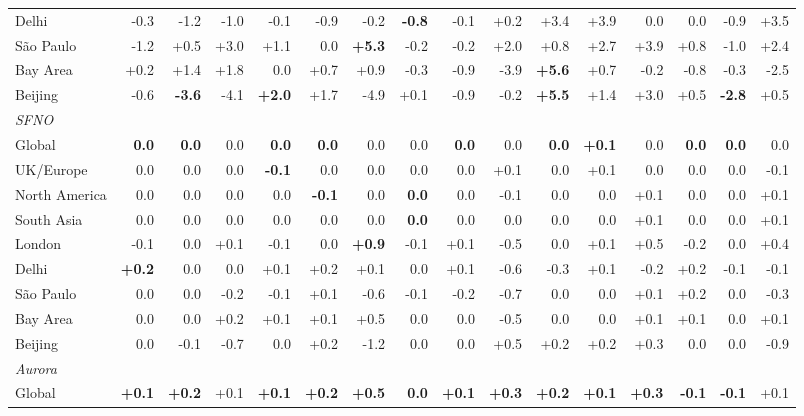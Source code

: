 \begin{table}[tbp]
\begin{tabular}{lrrrrrrrrrrrrrrr}
Delhi & -0.3 & -1.2 & -1.0 & -0.1 & -0.9 & -0.2 & \textbf{-0.8} & -0.1 & +0.2 & +3.4 & +3.9 & 0.0 & 0.0 & -0.9 & +3.5 \\
São Paulo & -1.2 & +0.5 & +3.0 & +1.1 & 0.0 & \textbf{+5.3} & -0.2 & -0.2 & +2.0 & +0.8 & +2.7 & +3.9 & +0.8 & -1.0 & +2.4 \\
Bay Area & +0.2 & +1.4 & +1.8 & 0.0 & +0.7 & +0.9 & -0.3 & -0.9 & -3.9 & \textbf{+5.6} & +0.7 & -0.2 & -0.8 & -0.3 & -2.5 \\
Beijing & -0.6 & \textbf{-3.6} & -4.1 & \textbf{+2.0} & +1.7 & -4.9 & +0.1 & -0.9 & -0.2 & \textbf{+5.5} & +1.4 & +3.0 & +0.5 & \textbf{-2.8} & +0.5 \\
\midrule
\multicolumn{16}{l}{\textit{SFNO}} \\
Global & \textbf{0.0} & \textbf{0.0} & 0.0 & \textbf{0.0} & \textbf{0.0} & 0.0 & 0.0 & \textbf{0.0} & 0.0 & \textbf{0.0} & \textbf{+0.1} & 0.0 & \textbf{0.0} & \textbf{0.0} & 0.0 \\
UK/Europe & 0.0 & 0.0 & 0.0 & \textbf{-0.1} & 0.0 & 0.0 & 0.0 & 0.0 & +0.1 & 0.0 & +0.1 & 0.0 & 0.0 & 0.0 & -0.1 \\
North America & 0.0 & 0.0 & 0.0 & 0.0 & \textbf{-0.1} & 0.0 & \textbf{0.0} & 0.0 & -0.1 & 0.0 & 0.0 & +0.1 & 0.0 & 0.0 & +0.1 \\
South Asia & 0.0 & 0.0 & 0.0 & 0.0 & 0.0 & 0.0 & \textbf{0.0} & 0.0 & 0.0 & 0.0 & 0.0 & +0.1 & 0.0 & 0.0 & +0.1 \\
London & -0.1 & 0.0 & +0.1 & -0.1 & 0.0 & \textbf{+0.9} & -0.1 & +0.1 & -0.5 & 0.0 & +0.1 & +0.5 & -0.2 & 0.0 & +0.4 \\
Delhi & \textbf{+0.2} & 0.0 & 0.0 & +0.1 & +0.2 & +0.1 & 0.0 & +0.1 & -0.6 & -0.3 & +0.1 & -0.2 & +0.2 & -0.1 & -0.1 \\
São Paulo & 0.0 & 0.0 & -0.2 & -0.1 & +0.1 & -0.6 & -0.1 & -0.2 & -0.7 & 0.0 & 0.0 & +0.1 & +0.2 & 0.0 & -0.3 \\
Bay Area & 0.0 & 0.0 & +0.2 & +0.1 & +0.1 & +0.5 & 0.0 & 0.0 & -0.5 & 0.0 & 0.0 & +0.1 & +0.1 & 0.0 & +0.1 \\
Beijing & 0.0 & -0.1 & -0.7 & 0.0 & +0.2 & -1.2 & 0.0 & 0.0 & +0.5 & +0.2 & +0.2 & +0.3 & 0.0 & 0.0 & -0.9 \\
\midrule
\multicolumn{16}{l}{\textit{Aurora}} \\
Global & \textbf{+0.1} & \textbf{+0.2} & +0.1 & \textbf{+0.1} & \textbf{+0.2} & \textbf{+0.5} & \textbf{0.0} & \textbf{+0.1} & \textbf{+0.3} & \textbf{+0.2} & \textbf{+0.1} & \textbf{+0.3} & \textbf{-0.1} & \textbf{-0.1} & +0.1 \\

\end{tabular}
\end{table}
